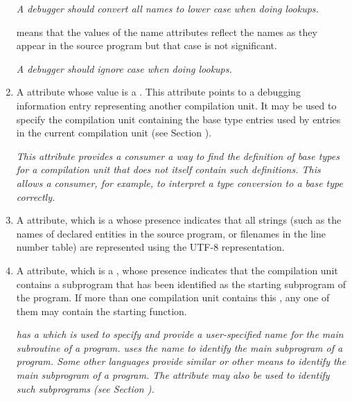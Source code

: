 \begin{enumerate}[1. ]
\textit{A debugger should convert all names to lower case 
when doing lookups.}

\DWIDcaseinsensitiveTARG{} means that the values of the name
attributes reflect the names as they appear in the source
program but that case is not significant.

\textit{A debugger should ignore case when doing lookups.}

\item \hypertarget{chap:DWATbasetypesprimitivedatatypesofcompilationunit}{}
A \DWATbasetypesDEFN{} attribute 
whose value is a . 
This attribute points to a debugging information entry
representing another compilation unit.  It may be used
to specify the compilation unit containing the base type
entries used by entries in the current compilation unit
(see Section ).

\textit{This attribute provides a consumer a way to find the definition
of base types for a compilation unit that does not itself
contain such definitions. This allows a consumer, for example,
to interpret a type conversion to a base type correctly.}

\item \hypertarget{chap:DWATuseUTF8compilationunitusesutf8strings}{}
A \DWATuseUTFeightDEFN{} attribute,
which is a  whose
presence indicates that all strings (such as the names of
declared entities in the source program, or filenames in the line number table) 
are represented using the UTF-8 representation. 

\item%
\hypertarget{chap:DWATmainsubprogramunitcontainingmainorstartingsubprogram}{}
A \DWATmainsubprogramDEFN{} attribute, 
which is a ,
whose presence indicates that the compilation unit contains a
subprogram that has been identified as the starting
subprogram of the program. If more than one compilation unit contains
this , any one of them may contain the starting 
function.

\textit{ has a 
which is used
to specify and provide a user-specified name for the main
subroutine of a program. 
 uses the name  to identify
the main subprogram of a program. Some other languages provide
similar or other means to identify the main subprogram of
a program. The \DWATmainsubprogram{} attribute may also be used to
identify such subprograms (see 
Section ).}


\end{enumerate}
